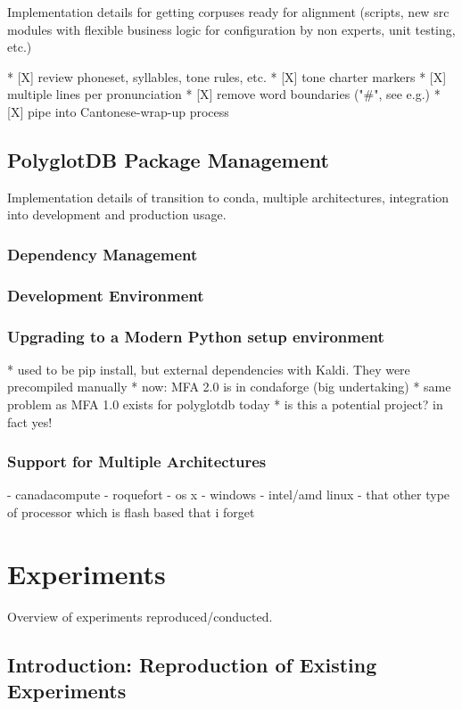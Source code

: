 \documentclass[11pt]{article}
\begin{document}
Implementation details for getting corpuses ready for alignment (scripts, new src modules with flexible business logic for configuration by non experts, unit testing, etc.)

    * [X] review phoneset, syllables, tone rules, etc.
    * [X] tone charter markers
    * [X] multiple lines per pronunciation
    * [X] remove word boundaries ("\#", see e.g.)
    * [X] pipe into Cantonese-wrap-up process


\subsection{PolyglotDB Package Management}

Implementation details of transition to conda, multiple architectures, integration into development and production usage.
\subsubsection{Dependency Management}
\subsubsection{Development Environment}
\subsubsection{Upgrading to a Modern Python setup environment}

* used to be pip install, but external dependencies with Kaldi. They were precompiled manually
* now: MFA 2.0 is in condaforge (big undertaking)
* same problem as MFA 1.0 exists for polyglotdb today
* is this a potential project? in fact yes!

\subsubsection{Support for Multiple Architectures}

- canadacompute
- roquefort
- os x
- windows
- intel/amd linux
- that other type of processor which is flash based that i forget

\section{Experiments}

Overview of experiments reproduced/conducted.

\subsection{Introduction: Reproduction of Existing Experiments}
\end{document}
